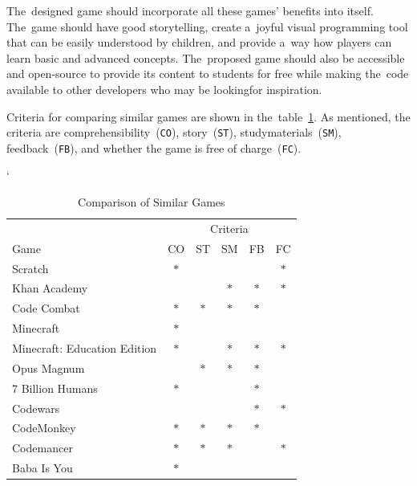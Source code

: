 The~designed game should incorporate all these games' benefits into itself.
The~game should have good storytelling, create a~joyful visual programming tool that can be easily understood by children, and provide a~way how players can learn basic and advanced concepts. 
The~proposed game should also be accessible and open-source to provide its content to students for free while making the~code available to other developers who may be looking\linebreak{}for inspiration.

Criteria for comparing similar games are shown in the~table~\ref{table:similargames}.
\linebreak
As mentioned, the criteria are comprehensibility~(\texttt{CO}), story~(\texttt{ST}), study\linebreak{}materials~(\texttt{SM}), feedback~(\texttt{FB}), and whether the game is free of charge~(\texttt{FC}).

\begin{table}[b]
    \catcode`
    \centering
    \begin{tabular}{lccccc}
    \toprule
     & \multicolumn{5}{c}{Criteria} \\
    \cmidrule(l){2-6} 
    \multicolumn{1}{l}{Game} &
        \multicolumn{1}{c}{CO} &
        \multicolumn{1}{c}{ST} &
        \multicolumn{1}{c}{SM} &
        \multicolumn{1}{c}{FB} &
        \multicolumn{1}{c}{FC} \\
    \midrule
                         Scratch                       & $\ast$ &        &        &        & $\ast$ \\
    \rowcolor[gray]{.95} Khan Academy                  &        &        & $\ast$ & $\ast$ & $\ast$ \\
                         Code Combat                   & $\ast$ & $\ast$ & $\ast$ & $\ast$ &        \\
    \rowcolor[gray]{.95} Minecraft                     & $\ast$ &        &        &        &        \\
                         Minecraft: Education Edition   & $\ast$ &        & $\ast$ & $\ast$ & $\ast$ \\
    \rowcolor[gray]{.95} Opus Magnum                   &        & $\ast$ & $\ast$ & $\ast$ &        \\
                         7 Billion Humans              & $\ast$ &        &        & $\ast$ &        \\
    \rowcolor[gray]{.95} Codewars                      &        &        &        & $\ast$ & $\ast$ \\
                         CodeMonkey                    & $\ast$ & $\ast$ & $\ast$ & $\ast$ &        \\
    \rowcolor[gray]{.95} Codemancer                    & $\ast$ & $\ast$ & $\ast$ &        & $\ast$ \\
                         Baba Is You                   & $\ast$ &        &        &        &        \\
    \bottomrule
    \end{tabular}
    \caption{Comparison of Similar Games}
    \label{table:similargames}
\end{table}